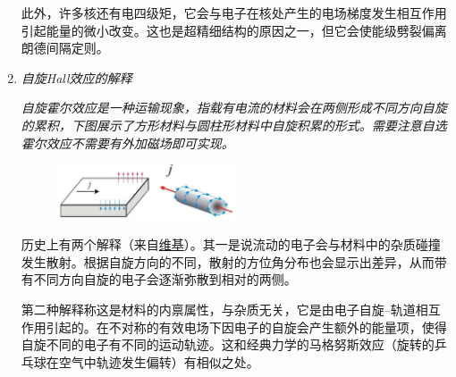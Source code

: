 \begin{enumerate}[label=\textbf{6.\Roman*}, listparindent=\parindent, leftmargin=-0.5mm]
此外，许多核还有电四级矩，它会与电子在核处产生的电场梯度发生相互作用引起能量的微小改变。这也是超精细结构的原因之一，但它会使能级劈裂偏离朗德间隔定则。

\item \emph{自旋Hall效应的解释}

\emph{自旋霍尔效应是一种运输现象，指载有电流的材料会在两侧形成不同方向自旋的累积，下图展示了方形材料与圆柱形材料中自旋积累的形式。需要注意自选霍尔效应不需要有外加磁场即可实现。}
\begin{figure}[!ht]
    \centering
    \includegraphics[width=0.5\textwidth]{pic/spin-hall}
\end{figure}

历史上有两个解释（来自\href{https://en.wikipedia.org/wiki/Spin_Hall_effect}{维基}）。其一是说流动的电子会与材料中的杂质碰撞发生散射。根据自旋方向的不同，散射的方位角分布也会显示出差异，从而带有不同方向自旋的电子会逐渐弥散到相对的两侧。

第二种解释称这是材料的内禀属性，与杂质无关，它是由电子自旋--轨道相互作用引起的。在不对称的有效电场下因电子的自旋会产生额外的能量项，使得自旋不同的电子有不同的运动轨迹。这和经典力学的马格努斯效应（旋转的乒乓球在空气中轨迹发生偏转）有相似之处。

\end{enumerate}